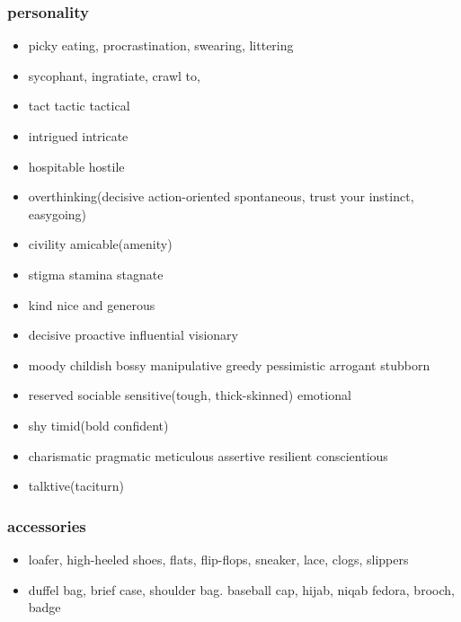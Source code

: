 \documentclass[a4paper,11pt,twoside]{book}
\begin{document}
\subsubsection{personality}
\begin{itemize}
	\item picky eating, procrastination, swearing, littering
	
	\item sycophant, ingratiate, crawl to, 
	
	\item tact tactic tactical
	
	\item intrigued intricate
	
	\item hospitable hostile

	\item overthinking(decisive action-oriented spontaneous, trust your instinct, easygoing)

    \item civility amicable(amenity)

	\item stigma stamina stagnate

	\item kind nice and generous 

	\item decisive proactive influential visionary 

	\item moody childish bossy manipulative greedy pessimistic arrogant stubborn

	\item reserved sociable sensitive(tough, thick-skinned) emotional 

	\item shy timid(bold confident)

	\item charismatic pragmatic meticulous assertive resilient conscientious

	\item talktive(taciturn)
\end{itemize}

\subsubsection{accessories}

\begin{itemize}
\item loafer, high-heeled shoes, flats, flip-flops, sneaker, lace, clogs, slippers 

\item duffel bag, brief case, shoulder bag. baseball cap, hijab, niqab fedora, brooch, badge
\end{itemize}
\end{document}
